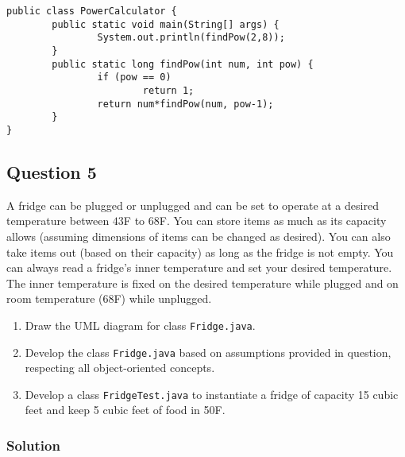 \lstset{language=java, tabsize=2}
\begin{lstlisting}
public class PowerCalculator {
		public static void main(String[] args) {
				System.out.println(findPow(2,8));
		}
		public static long findPow(int num, int pow) {
				if (pow == 0)
						return 1;
				return num*findPow(num, pow-1);
		}
}
\end{lstlisting}

\newpage
\subsection*{Question 5}

A fridge can be plugged or unplugged and can be set to operate at a desired temperature between $43$F to $68$F. You can store items as much as its capacity allows (assuming dimensions of items can be changed as desired). You can also take items out (based on their capacity) as long as the fridge is not empty.
You can always read a fridge's inner temperature and set your desired temperature. The inner temperature is fixed on the desired temperature while plugged and on room temperature (68F) while unplugged.

\begin{enumerate}[label=(\alph*)]
\item Draw the UML diagram for class \texttt{Fridge.java}.
\item Develop the class \texttt{Fridge.java} based on assumptions provided in question, respecting all object-oriented concepts.
\item Develop a class \texttt{FridgeTest.java} to instantiate a fridge of capacity 15 cubic feet and keep 5 cubic feet of food in 50F.
\end{enumerate}

\subsubsection*{Solution}

